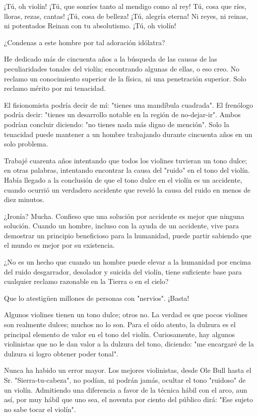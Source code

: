 \documentclass[12pt]{book}
\begin{document}
¡Tú, oh violín!
¡Tú, que sonríes tanto al mendigo como al rey!
Tú, cosa que ríes, lloras, rezas, cantas!
¡Tú, cosa de belleza!
¡Tú, alegría eterna!
Ni reyes, ni reinas, ni potentados
Reinan con tu absolutismo.
¡Tú, oh violín!

¿Condenas a este hombre por tal adoración idólatra?

He dedicado más de cincuenta años a la búsqueda de las causas de las peculiaridades tonales del violín; encontrando algunas de ellas, o eso creo. No reclamo un conocimiento superior de la física, ni una penetración superior. Solo reclamo mérito por mi tenacidad.

El fisionomista podría decir de mí: "tienes una mandíbula cuadrada". El frenólogo podría decir: "tienes un desarrollo notable en la región de no-dejar-ir". Ambos podrían concluir diciendo: "no tienes nada más digno de mención". Solo la tenacidad puede mantener a un hombre trabajando durante cincuenta años en un solo problema.

Trabajé cuarenta años intentando que todos los violines tuvieran un tono dulce; en otras palabras, intentando encontrar la causa del "ruido" en el tono del violín. Había llegado a la conclusión de que el tono dulce en el violín es un accidente, cuando ocurrió un verdadero accidente que reveló la causa del ruido en menos de diez minutos.

¿Ironía?
Mucha.
Confieso que una solución por accidente es mejor que ninguna solución. Cuando un hombre, incluso con la ayuda de un accidente, vive para demostrar un principio beneficioso para la humanidad, puede partir sabiendo que el mundo es mejor por su existencia.

¿No es un hecho que cuando un hombre puede elevar a la humanidad por encima del ruido desgarrador, desolador y suicida del violín, tiene suficiente base para cualquier reclamo razonable en la Tierra o en el cielo?

Que lo atestigüen millones de personas con "nervios".
¡Basta!

Algunos violines tienen un tono dulce; otros no.
La verdad es que pocos violines son realmente dulces; muchos no lo son.
Para el oído atento, la dulzura es el principal elemento de valor en el tono del violín. Curiosamente, hay algunos violinistas que no le dan valor a la dulzura del tono, diciendo: "me encargaré de la dulzura si logro obtener poder tonal".

Nunca ha habido un error mayor.
Los mejores violinistas, desde Ole Bull hasta el Sr. "Sierra-tu-cabeza", no podían, ni podrán jamás, ocultar el tono "ruidoso" de un violín. Admitiendo una diferencia a favor de la técnica hábil con el arco, aun así, por muy hábil que uno sea, el noventa por ciento del público dirá: "Ese sujeto no sabe tocar el violín".
\end{document}
